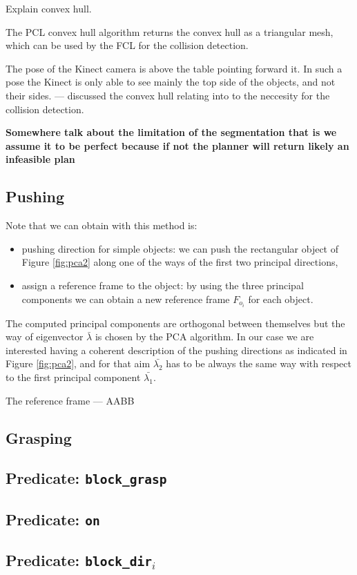 Explain convex hull.

The PCL convex hull algorithm returns the convex hull as a triangular mesh, which can be used by the FCL for the collision detection. 

The pose of the Kinect camera is above the table pointing forward it. In such a pose the Kinect is only able to see mainly the top side of the objects, and not their sides. 
--- discussed the convex hull relating into to the neccesity for the collision detection.

\textbf{Somewhere talk about the limitation of the segmentation that is we assume it to be perfect because if not the planner will return likely an infeasible plan}

\subsection{Pushing}

Note that we can obtain with this method is:
\begin{itemize}
\item pushing direction for simple objects: we can push the rectangular object of Figure \ref{fig:pca2} along one of the ways of the first two principal directions, 
\item assign a reference frame to the object: by using the three principal components we can obtain a new reference frame $F_{o_i}$ for each object.
\end{itemize}

The computed principal components are orthogonal between themselves but the way of eigenvector $\bar{\lambda}$ is chosen by the PCA algorithm. In our case we are interested having a coherent description of the pushing directions as indicated in Figure \ref{fig:pca2}, and for that aim $\bar{\lambda_2}$ has to be always the same way with respect to the first principal component $\bar{\lambda_1}$. 

The reference frame --- AABB

\subsection{Grasping}

\subsection{Predicate: \texttt{block\_grasp}}
\subsection{Predicate: \texttt{on}}
\subsection{Predicate: \texttt{block\_dir$_i$}}
